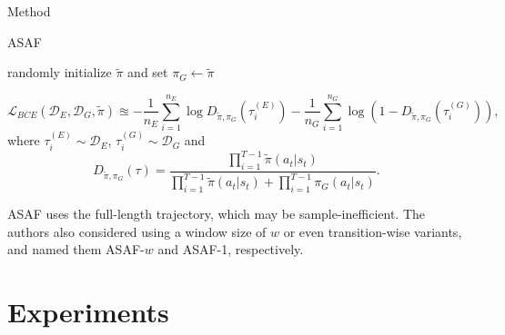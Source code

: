 \documentclass[10pt,aspectratio=169]{beamer}
\begin{document}
\begin{frame}{Method}
	\begin{algorithm}[H]
		\caption{ASAF}
		\label{algo:asaf}
			randomly initialize $\tilde{\pi}$ and set $\pi_G \gets \tilde{\pi}$\;
	\end{algorithm}

	\begin{equation}\label{equ:2}
		\mathcal{L}_{BCE}(\mathcal{D}_E,\mathcal{D}_G, \tilde{\pi}) \approxeq -\frac{1}{n_E}\sum_{i=1}^{n_E}\log D_{\tilde{\pi}, \pi_G}(\tau_i^{(E)})-\frac{1}{n_G}\sum_{i=1}^{n_G}\log\left(1- D_{\tilde{\pi}, \pi_G}(\tau_i^{(G)})\right),
	\end{equation}
	where $\tau_i^{(E)} \sim \mathcal{D}_E$, $\tau_i^{(G)} \sim \mathcal{D}_G$ and
	\begin{equation}\label{equ:emp_d}
		D_{\tilde{\pi}, \pi_G}(\tau) = \frac{\prod_{i=1}^{T-1}\tilde{\pi}(a_t|s_t)}{\prod_{i=1}^{T-1}\tilde{\pi}(a_t|s_t) + \prod_{i=1}^{T-1}\pi_G(a_t|s_t)}.
	\end{equation}

    \begin{remark}
		ASAF uses the full-length trajectory, which may be sample-inefficient. The authors also considered using a window size of $w$ or even transition-wise variants, and named them ASAF-$w$ and ASAF-1, respectively.
	\end{remark}
\end{frame}

\section{Experiments}
\end{document}
